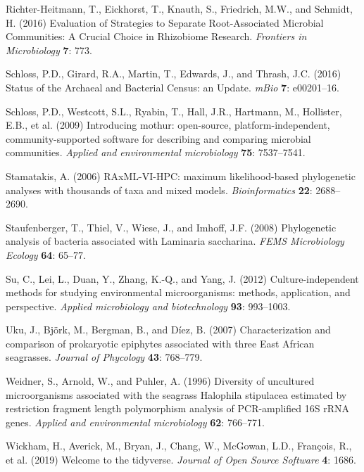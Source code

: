 \documentclass[12pt,]{article}
\begin{document}
\hypertarget{ref-Richter-Heitmann2016}{}
Richter-Heitmann, T., Eickhorst, T., Knauth, S., Friedrich, M.W., and
Schmidt, H. (2016) Evaluation of Strategies to Separate Root-Associated
Microbial Communities: A Crucial Choice in Rhizobiome Research.
\emph{Frontiers in Microbiology} \textbf{7}: 773.

\hypertarget{ref-Schloss2016}{}
Schloss, P.D., Girard, R.A., Martin, T., Edwards, J., and Thrash, J.C.
(2016) Status of the Archaeal and Bacterial Census: an Update.
\emph{mBio} \textbf{7}: e00201--16.

\hypertarget{ref-Schloss2009}{}
Schloss, P.D., Westcott, S.L., Ryabin, T., Hall, J.R., Hartmann, M.,
Hollister, E.B., et al. (2009) Introducing mothur: open-source,
platform-independent, community-supported software for describing and
comparing microbial communities. \emph{Applied and environmental
microbiology} \textbf{75}: 7537--7541.

\hypertarget{ref-Stamatakis2006}{}
Stamatakis, A. (2006) RAxML-VI-HPC: maximum likelihood-based
phylogenetic analyses with thousands of taxa and mixed models.
\emph{Bioinformatics} \textbf{22}: 2688--2690.

\hypertarget{ref-Staufenberger2008}{}
Staufenberger, T., Thiel, V., Wiese, J., and Imhoff, J.F. (2008)
Phylogenetic analysis of bacteria associated with Laminaria saccharina.
\emph{FEMS Microbiology Ecology} \textbf{64}: 65--77.

\hypertarget{ref-Su2012}{}
Su, C., Lei, L., Duan, Y., Zhang, K.-Q., and Yang, J. (2012)
Culture-independent methods for studying environmental microorganisms:
methods, application, and perspective. \emph{Applied microbiology and
biotechnology} \textbf{93}: 993--1003.

\hypertarget{ref-Uku2007}{}
Uku, J., Björk, M., Bergman, B., and Díez, B. (2007) Characterization
and comparison of prokaryotic epiphytes associated with three East
African seagrasses. \emph{Journal of Phycology} \textbf{43}: 768--779.

\hypertarget{ref-Weidner1996}{}
Weidner, S., Arnold, W., and Puhler, A. (1996) Diversity of uncultured
microorganisms associated with the seagrass Halophila stipulacea
estimated by restriction fragment length polymorphism analysis of
PCR-amplified 16S rRNA genes. \emph{Applied and environmental
microbiology} \textbf{62}: 766--771.

\hypertarget{ref-Wickham2019}{}
Wickham, H., Averick, M., Bryan, J., Chang, W., McGowan, L.D., François,
R., et al. (2019) Welcome to the tidyverse. \emph{Journal of Open Source
Software} \textbf{4}: 1686.
\end{document}
